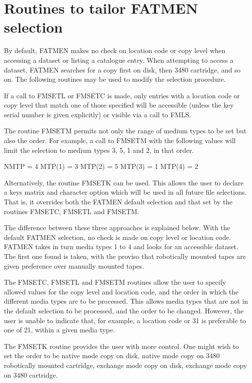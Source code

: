 \section{Routines to tailor FATMEN selection}
\par
By default, FATMEN makes no check on location code or copy
level when accessing a dataset or listing a catalogue entry.
When attempting to access a dataset, FATMEN searches
for a copy first on disk, then 3480 cartridge, and so on.
The following routines may be used to modify the selection
procedure.
\par
If a call to FMSETL or FMSETC is made, only entries with
a location code or copy level that match one of those
specified will be accessible (unless the key serial number
is given explicitly) or visible via a call to FMLS.
\par
The routine FMSETM permits not only the range of medium
types to be set but also the order.
For example, a call to FMSETM with the following values
will limit the selection to medium types 3, 5, 1 and 2,
in that order.
\begin{XMP}
      NMTP = 4
      MTP(1) = 3
      MTP(2) = 5
      MTP(3) = 1
      MTP(4) = 2
\end{XMP}
\par
Alternatively, the routine FMSETK can be used. This allows the
user to declare a keys matrix and character option which will
be used in all future file selections. That is, it overrides
both the FATMEN default selection and that set by the routines
FMSETC, FMSETL and FMSETM.
\par
The difference between these three approaches is explained below.
With the default FATMEN selection, no check is made on copy level
or location code. FATMEN takes in turn media types 1 to 4 and
looks for an accessible dataset. The first one found is taken,
with the proviso that robotically mounted tapes are given preference
over manually mounted tapes.
\par
The FMSETC, FMSETL and FMSETM routines allow the user to specify
allowed values for the copy level and location code, and the
order in which the different media types are to be processed.
This allows media types that are not in the default selection
to be processed, and the order to be changed. 
However, the user is unable to indicate that, for example,
a location code or 31 is preferable to one of 21, within
a given media type.
\par
The FMSETK routine provides the user with more control.
One might wish to set the order to be native mode copy
on disk, native mode copy on 3480 robotically mounted
cartridge, exchange mode copy on disk, exchange mode
copy on 3480 cartridge. 
